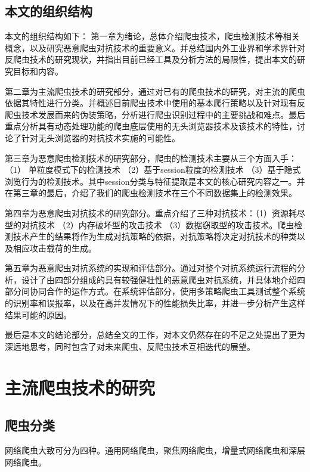 \documentclass[doctor,privacy,twoside]{buaa_mac}
\begin{document}
\section{本文的组织结构}
本文的组织结构如下：
第一章为绪论，总体介绍爬虫技术，爬虫检测技术等相关概念，以及研究恶意爬虫对抗技术的重要意义。并总结国内外工业界和学术界针对反爬虫技术的研究现状，并指出目前已经工具及分析方法的局限性，提出本文的研究目标和内容。


第二章为主流爬虫技术的研究部分，通过对已有的爬虫技术的研究，对主流的爬虫依据其特性进行分类。并概述目前爬虫技术中使用的基本爬行策略以及针对现有反爬虫技术发展而来的伪装策略，分析进行爬虫识别过程中的主要挑战和难点。最后重点分析具有动态处理功能的爬虫底层使用的无头浏览器技术及该技术的特性，讨论了针对无头浏览器的对抗技术实施的可能性。

第三章为恶意爬虫检测技术的研究部分，爬虫的检测技术主要从三个方面入手：（1） 单粒度模式下的检测技术 （2）基于session粒度的检测技术  （3）基于隐式浏览行为的检测技术。其中session分类与特征提取是本文的核心研究内容之一。并在第三章的最后，介绍了我们的爬虫检测技术在三个不同数据集上的检测效果。

第四章为恶意爬虫对抗技术的研究部分。重点介绍了三种对抗技术：（1）资源耗尽型的对抗技术 （2）内存破坏型的攻击技术 （3）数据窃取型的攻击技术。爬虫检测技术产生的结果将作为生成对抗策略的依据，对抗策略将决定对抗技术的种类以及相应攻击载荷的生成。

第五章为恶意爬虫对抗系统的实现和评估部分。通过对整个对抗系统运行流程的分析，设计了由四部分组成的具有较强健壮性的恶意爬虫对抗系统，并具体地介绍四部分间协同合作的运作方式。在系统评估部分，使用多策略爬虫工具测试整个系统的识别率和误报率，以及在高并发情况下的性能损失比率，并进一步分析产生这样结果可能的原因。

最后是本文的结论部分，总结全文的工作，对本文仍然存在的不足之处提出了更为深远地思考，同时包含了对未来爬虫、反爬虫技术互相迭代的展望。






\chapter{主流爬虫技术的研究}

\section{爬虫分类}
网络爬虫大致可分为四种。通用网络爬虫，聚焦网络爬虫，增量式网络爬虫和深层网络爬虫。
\end{document}
